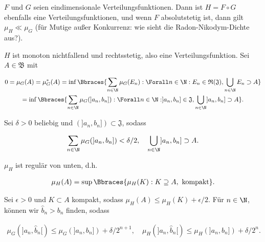 
\begin{exercise}

$F$ und $G$ seien eindimensionale Verteilungsfunktionen.
Dann ist $H = F \circ G$ ebenfalls eine Verteilungsfunktionen, und wenn $F$ absolutstetig ist, dann gilt $\mu_H \ll \mu_G$ (für Mutige außer Konkurrenz: wie sieht die Radon-Nikodym-Dichte aus?).

\end{exercise}


\begin{solution}

$H$ ist monoton nichtfallend und rechtsstetig, also eine Verteilungsfunktion.
Sei $A \in \mathfrak B$ mit

\begin{multline*}
    0
    =
    \mu_G(A)
    =
    \mu_G^\ast(A)
    =
    \inf \Bbraces{\sum_{n \in \N} \mu_G(E_n): \Forall n \in \N: E_n \in \mathfrak R(\mathfrak J), \bigcup_{n \in \N} E_n \supset A} \\
    =
    \inf \Bbraces{\sum_{n \in \N} \mu_G(]a_n, b_n]): \Forall n \in \N: ]a_n, b_n] \in \mathfrak J, \bigcup_{n \in \N} ]a_n, b_n] \supset A}.
\end{multline*}

Sei $\delta > 0$ beliebig und $(]a_n, b_n]) \subset \mathfrak J$, sodass

\begin{align*}
    \sum_{n \in \N} \mu_G(]a_n, b_n]) < \delta / 2,
    \quad
    \bigcup_{n \in \N} ]a_n, b_n] \supset A.
\end{align*}

$\mu_H$ ist regulär von unten, d.h.

\begin{align*}
    \mu_H(A) = \sup \Bbraces{\mu_H(K): K \supseteq A, ~\text{kompakt}}.
\end{align*}

Sei $\epsilon > 0$ und $K \subset A$ kompakt, sodass $\mu_H(A) \leq \mu_H(K) + \epsilon / 2$.
Für $n \in \N$, können wir $\hat b_n > b_n$ finden, sodass

\begin{align*}
    \mu_G(]a_n, \hat b_n[) \leq \mu_G(]a_n, b_n]) + \delta / 2^{n+1},
    \quad
    \mu_H(]a_n, \hat b_n[) \leq \mu_H(]a_n, b_n]) + \delta / 2^n.
\end{align*}


\end{solution}
